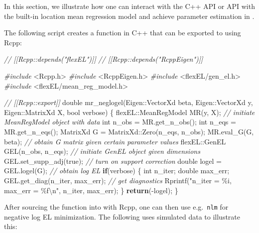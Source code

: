 \documentclass[article]{jss}
\newenvironment{Shaded}{\begin{snugshade}}{\end{snugshade}}
\newcommand{\CommentTok}[1]{\textcolor[rgb]{0.56,0.35,0.01}{\textit{#1}}}
\newcommand{\ControlFlowTok}[1]{\textcolor[rgb]{0.13,0.29,0.53}{\textbf{#1}}}
\newcommand{\DataTypeTok}[1]{\textcolor[rgb]{0.13,0.29,0.53}{#1}}
\newcommand{\ImportTok}[1]{#1}
\newcommand{\NormalTok}[1]{#1}
\newcommand{\PreprocessorTok}[1]{\textcolor[rgb]{0.56,0.35,0.01}{\textit{#1}}}
\newcommand{\SpecialCharTok}[1]{\textcolor[rgb]{0.00,0.00,0.00}{#1}}
\newcommand{\StringTok}[1]{\textcolor[rgb]{0.31,0.60,0.02}{#1}}
\renewcommand{\|}{\,|\,}
\begin{document}
In this section, we illustrate how one can interact with the C++ API or  API with the built-in location mean regression model and achieve parameter estimation in .

The following script creates a function in C++ that can be exported to  using Rcpp:

\begin{Shaded}
\begin{Highlighting}[]
\CommentTok{// [[Rcpp::depends("flexEL")]]}
\CommentTok{// [[Rcpp::depends("RcppEigen")]]}

\PreprocessorTok{\#include }\ImportTok{\textless{}Rcpp.h\textgreater{}}
\PreprocessorTok{\#include }\ImportTok{\textless{}RcppEigen.h\textgreater{}}
\PreprocessorTok{\#include }\ImportTok{\textless{}flexEL/gen\_el.h\textgreater{}}
\PreprocessorTok{\#include }\ImportTok{\textless{}flexEL/mean\_reg\_model.h\textgreater{}}

\CommentTok{// [[Rcpp::export]]}
\DataTypeTok{double}\NormalTok{ mr\_neglogel(Eigen::VectorXd beta,}
\NormalTok{                   Eigen::VectorXd y,}
\NormalTok{                   Eigen::MatrixXd X,}
                   \DataTypeTok{bool}\NormalTok{ verbose) \{}
\NormalTok{  flexEL::MeanRegModel MR(y, X); }\CommentTok{// initiate MeanRegModel object with data}
  \DataTypeTok{int}\NormalTok{ n\_obs = MR.get\_n\_obs();}
  \DataTypeTok{int}\NormalTok{ n\_eqs = MR.get\_n\_eqs();}
\NormalTok{  MatrixXd G = MatrixXd::Zero(n\_eqs, n\_obs);}
\NormalTok{  MR.eval\_G(G, beta); }\CommentTok{// obtain G matrix given certain parameter values}
\NormalTok{  flexEL::GenEL GEL(n\_obs, n\_eqs); }\CommentTok{// initiate GenEL object given dimensions}
\NormalTok{  GEL.set\_supp\_adj(true); }\CommentTok{// turn on support correction}
  \DataTypeTok{double}\NormalTok{ logel = GEL.logel(G); }\CommentTok{// obtain log EL}
  \ControlFlowTok{if}\NormalTok{(verbose) \{}
    \DataTypeTok{int}\NormalTok{ n\_iter;}
    \DataTypeTok{double}\NormalTok{ max\_err;}
\NormalTok{    GEL.get\_diag(n\_iter, max\_err); }\CommentTok{// get diagnostics}
\NormalTok{    Rprintf(}\StringTok{"n\_iter = \%i, max\_err = \%f}\SpecialCharTok{\textbackslash{}n}\StringTok{"}\NormalTok{, n\_iter, max\_err);}
\NormalTok{  \}}
  \ControlFlowTok{return}\NormalTok{({-}logel);}
\NormalTok{\}}
\end{Highlighting}
\end{Shaded}

After sourcing the function into  with Rcpp, one can then use e.g.~\texttt{nlm} for negative log EL minimization. The following uses simulated data to illustrate this:
\end{document}
